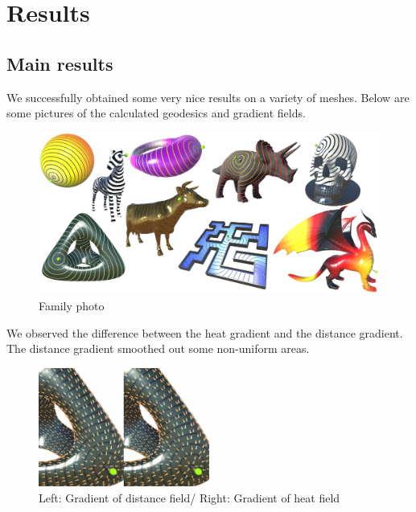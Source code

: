 \documentclass[a4paper,12pt,twoside]{article}
\begin{document}
\section{Results}

\subsection{Main results}

We successfully obtained some very nice results on a variety of meshes. Below are some pictures of the calculated geodesics and gradient fields.

\begin{figure}[htb]
	\centering
	\includegraphics[width=\textwidth]{P4.png}
	\caption{Family photo}
\end{figure}

We observed the difference between the heat gradient and the distance gradient. The distance gradient smoothed out some non-uniform areas.

\begin{figure}[htb]
	\centering
	\includegraphics[width=0.5\textwidth]{P2.png}
	\caption{Left: Gradient of distance field/ Right: Gradient of heat field}
\end{figure}

\end{document}
